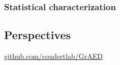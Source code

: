 \documentclass[main]{subfiles}
\begin{document}
\subsubsection{Statistical characterization}



\subsection{Perspectives}

\url{github.com/coudertlab/GrAED}


\OnlyInSubfile{\printglobalbibliography}
\end{document}
